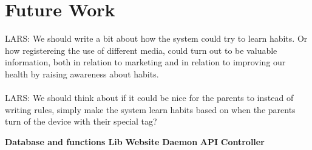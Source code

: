 \chapter{Future Work}
LARS: We should write a bit about how the system could try to learn habits. Or how registereing the use of different media, could turn out to be valuable information, both in relation to marketing and in relation to improving our health by raising awareness about habits.\\
\\
LARS: We should think about if it could be nice for the parents to instead of writing rules, simply make the system learn habits based on when the parents turn of the device with their special tag?

\textbf{Database and functions Lib}
\textbf{Website}
\textbf{Daemon}
\textbf{API}
\textbf{Controller}


